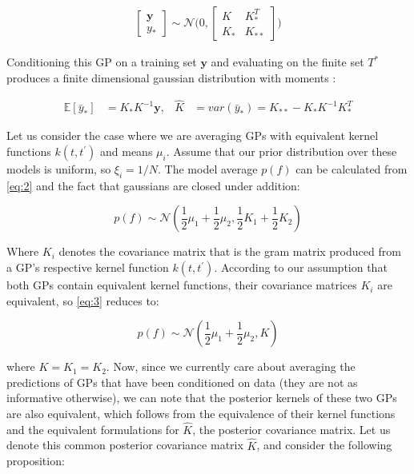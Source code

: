 \documentclass[12pt]{article}
\begin{document}
\begin{align}
  \begin{bmatrix}
    \textbf{y} \\
    y_*
\end{bmatrix} \sim \mathcal{N} \bigg( 0,\begin{bmatrix}
      K & K_*^T \\
      K_* & K_{**}
  \end{bmatrix} \bigg)
\end{align}

Conditioning this GP on a training set $\textbf{y}$ and evaluating on the finite set $T^*$ produces
a finite dimensional gaussian distribution with moments \cite{1505.02965}:

\begin{align*}
    \mathbb{E}[\bar{y}_*] &= K_* K^{-1} \textbf{y}, &
    \hat{K} &= var(\bar{y}_*) = K_{**} - K_{*} K^{-1} K_*^T
\end{align*}

Let us consider the case where we are averaging GPs with equivalent
kernel functions $k(t, t^\prime)$ and means $\mu_i$. Assume that our prior
distribution over these models is uniform, so $\xi_i = 1/N$. The model average $p(f)$ can
be calculated from \ref{eq:2} and the fact that gaussians are closed under addition:

\begin{equation} \label{eq:3}
    p(f) \sim \mathcal{N}(\frac{1}{2} \mu_1 + \frac{1}{2} \mu_2, \frac{1}{2} K_1 + \frac{1}{2} K_2)
\end{equation}

Where $K_i$ denotes the covariance matrix that is the gram matrix produced from a GP's
respective kernel function $k(t, t^\prime)$. According to our assumption that both GPs
contain equivalent kernel functions, their covariance matrices $K_i$ are equivalent,
so \ref{eq:3} reduces to:

\begin{equation} \label{eq:4}
    p(f) \sim \mathcal{N}(\frac{1}{2} \mu_1 + \frac{1}{2} \mu_2, K)
\end{equation}

where $K = K_1 = K_2$. Now, since we currently care about averaging the predictions
of GPs that have been conditioned on data (they are not as informative otherwise),
we can note that the posterior kernels of these two GPs are also equivalent, which
follows from the equivalence of their kernel functions and the equivalent formulations
for $\hat{K}$, the posterior covariance matrix. Let us denote this common posterior covariance matrix
$\hat{K}$, and consider the following proposition:
\end{document}
